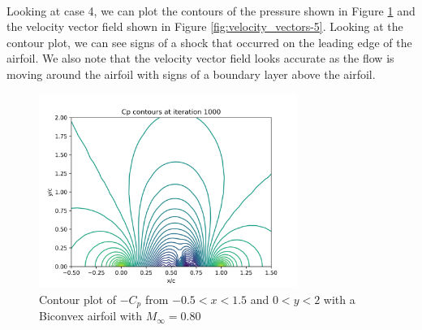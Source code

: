 \documentclass[12pt]{article}
\theoremstyle{definition}
\begin{document}
\vspace{1cm}



\\

Looking at case 4, we can plot the contours of the pressure shown in Figure \ref{fig:cp_contours-5} and the velocity vector field shown in Figure \ref{fig:velocity_vectors-5}. Looking at the contour plot, we can see signs of a shock that occurred on the leading edge of the airfoil. We also note that the velocity vector field looks accurate as the flow is moving around the airfoil with signs of a boundary layer above the airfoil.

\begin{figure}
    \centering
    \includegraphics[width=0.75\textwidth,height=\textwidth,keepaspectratio]{images/cp_contours-5.png}
    \caption{Contour plot of $-C_p$ from $-0.5 < x < 1.5$ and $0 < y <2$ with a Biconvex airfoil with $M_\infty = 0.80$}
    \label{fig:cp_contours-5}
\end{figure}
\end{document}
